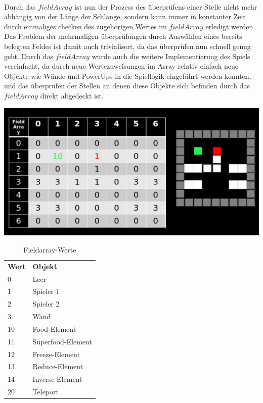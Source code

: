 \\
Durch das $fieldArray$ ist nun der Prozess des {\"u}berpr{\"u}fens einer Stelle nicht mehr abh{\"a}ngig von der L{\"a}nge der Schlange, sondern kann immer in konstanter Zeit durch einmaliges checken des zugeh{\"o}rigen Wertes im $fieldArray$ erledigt werden. Das Problem der mehrmaligen {\"u}berpr{\"u}fungen durch Ausw{\"a}hlen eines bereits belegten Feldes ist damit auch trivialisert, da das {\"u}berpr{\"u}fen nun schnell genug geht. Durch das $fieldArray$ wurde auch die weitere Implementierung des Spiels vereinfacht, da durch neue Wertezuweisungen im Array relativ einfach neue Objekte wie W{\"a}nde und PowerUps in die Spiellogik eingef{\"u}hrt werden konnten, und das {\"u}berpr{\"u}fen der Stellen an denen diese Objekte sich befinden durch das $fieldArray$ direkt abgedeckt ist.

\begin{minipage}[X]{1.1\textwidth}
 \centering
 \includegraphics[scale=0.3]{bilder/FieldArraySpielfeld}
 \label{fig:FieldArraySpielfeld}
\end{minipage}

\begin{table}[h]
     \centering
     \begin{tabular}{ll}
       \textbf{Wert}  & \textbf{Objekt} \\
       0          & Leer                 \\
       1         & Spieler 1             \\
       2         & Spieler 2             \\
       3         & Wand                 \\
       10        & Food-Element             \\
       11        & Superfood-Element             \\
       12        & Freeze-Element             \\
       13        & Reduce-Element             \\
       14        & Inverse-Element             \\
       20        & Teleport             \\
     \end{tabular}

     \caption{Fieldarray-Werte}
     \label{tbl:Fieldarray-Werte}

   \end{table}




